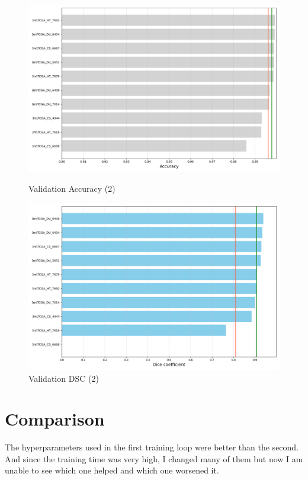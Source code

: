 \documentclass[11pt,a4paper]{article}
\begin{document}
\begin{figure}[H]
    \centering
    \begin{minipage}[t]{0.48\textwidth}
        \centering
        \includegraphics[width=\linewidth]{./img/validation_accuracy_2.png}
        \caption{Validation Accuracy (2)}
        \label{fig:validation_accuracy_2}
    \end{minipage}
    \hfill
    \begin{minipage}[t]{0.48\textwidth}
        \centering
        \includegraphics[width=\linewidth]{./img/validation_dsc_2.png}
        \caption{Validation DSC (2)}
        \label{fig:validation_dsc_2}
    \end{minipage}
\end{figure}

\section{Comparison}
The hyperparameters used in the first training loop were better than the second. And since the training time was very high, I changed many of them but now I am unable to see which one helped and which one worsened it.
\end{document}
